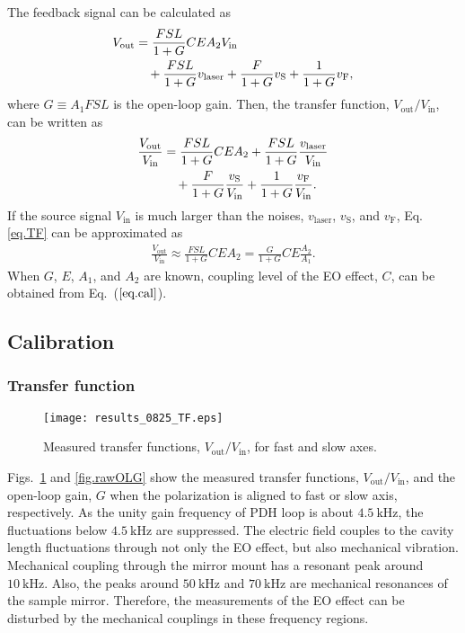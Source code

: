 \documentclass[%
 reprint,
 superscriptaddress,
 amsmath,amssymb,
 aps,
]{revtex4-2}
\newcommand{\unit}[1]{\ \mathrm{#1}}
\begin{document}
The feedback signal can be calculated as
\begin{align}
    V_{\mathrm{out}}
    &= \frac{{FSL}}{1+{G}}CEA_2V_{\mathrm{in}} \notag \\ &\quad + \frac{{FSL}}{1+{G}}v_{\mathrm{laser}} + \frac{{F}}{1+{G}}v_{\mathrm{S}} + \frac{1}{1+{G}}v_{\mathrm{F}},
\end{align}
where $G \equiv A_1FSL$ is the open-loop gain.
Then, the transfer function, $V_{\mathrm{out}}/V_{\mathrm{in}}$, can be written as
\begin{align}
    \frac{V_{\mathrm{out}}}{V_{\mathrm{in}}} &= \frac{{FSL}}{1+{G}}{CEA}_2 + \frac{{FSL}}{1+{G}}\frac{v_{\mathrm{laser}}}{V_{\mathrm{in}}} \notag \\ &\quad + \frac{{F}}{1+{G}}\frac{v_{\mathrm{S}}}{V_{\mathrm{in}}} + \frac{1}{1+{G}}\frac{v_{\mathrm{F}}}{V_{\mathrm{in}}}.
    \label{eq.TF}
\end{align}
If the source signal $V_{\mathrm{in}}$ is much larger than the noises, $v_{\mathrm{laser}}$, $v_{\mathrm{S}}$, and $v_{\mathrm{F}}$, Eq. \ref{eq.TF} can be approximated as
\begin{align}
    \frac{V_{\mathrm{out}}}{V_{\mathrm{in}}} \approx \frac{FSL}{1+G}CEA_2 = \frac{G}{1+G}CE\frac{A_2}{A_1}.
    \label{eq.cal}
\end{align}
When $G$, $E$, $A_1$, and $A_2$ are known, coupling level of the EO effect, $C$, can be obtained from Eq.~($\ref{eq.cal}$).

\subsection{Calibration}

\subsubsection{Transfer function}

\begin{figure}[htbp]
\texttt{[image: results\_0825\_TF.eps]}
\caption{
Measured transfer functions, $V_{\mathrm{out}}/V_{\mathrm{in}}$, for fast and slow axes.
}
\label{fig.rawTF}
\end{figure}

Figs.~\ref{fig.rawTF} and \ref{fig.rawOLG} show the measured transfer functions, $V_{\mathrm{out}}/V_{\mathrm{in}}$, and the open-loop gain, $G$ when the polarization is aligned to fast or slow axis, respectively.
As the unity gain frequency of PDH loop is about $4.5\unit{kHz}$, the fluctuations below $4.5\unit{kHz}$ are suppressed.
The electric field couples to the cavity length fluctuations through not only the EO effect, but also mechanical vibration.
Mechanical coupling through the mirror mount has a resonant peak around $10\unit{kHz}$.
Also, the peaks around $50\unit{kHz}$ and $70\unit{kHz}$ are mechanical resonances of the sample mirror.
Therefore, the measurements of the EO effect can be disturbed by the mechanical couplings in these frequency regions.
\end{document}
